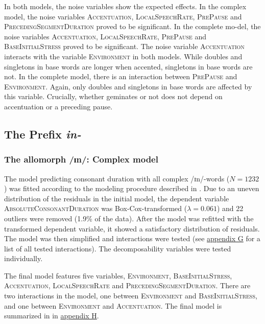  In both models, the noise variables show the expected effects. In the complex model, the noise variables \textsc{Accentuation}, \textsc{LocalSpeechRate}, \textsc{PrePause} and \textsc{PrecedingSegmentDuration} proved to be significant. In the complete mo-del, the noise variables \textsc{Accentuation}, \textsc{LocalSpeechRate}, \textsc{PrePause} and \textsc{BaseInitialStress} proved to be significant.
 The noise variable \textsc{Accentuation} interacts with the variable \textsc{Environment} in both models. While doubles and singletons in base words are longer when accented, singletons in base words are not. In the complete model, there is an interaction between \textsc{PrePause} and \textsc{Environment}. Again, only doubles and singletons in base words are affected by this variable. Crucially,  whether  geminates or not does not depend on accentuation or a preceding pause. 


\subsection{The Prefix \textit{in-}} \label{in experiment}

\subsubsection{The allomorph /ɪn/: Complex model}

The model predicting consonant duration with all complex /ɪn/-words ($N=1232$) was fitted according to the modeling procedure described in . Due to an uneven distribution of the residuals in the initial model, the dependent variable \textsc{AbsoluteConsonantDuration} was Box-Cox-transformed ($\lambda = 0.061$) and 22 outliers were removed (1.9\% of the data).
After the model was refitted with the transformed dependent variable, it showed a satisfactory distribution of residuals.  The model was then simplified and interactions were tested (see \hyperref[Appendix G Summaries of tested interactions in experimental study]{appendix G} for a list of all tested interactions).
The decomposability variables were tested individually.

The final model features five variables, \textsc{Environment}, \textsc{BaseInitialStress}, \textsc{Accentuation}, \textsc{LocalSpeechRate} and \textsc{PrecedingSegmentDuration}. 
There are two interactions in the model, one between \textsc{Environment} and \textsc{BaseInitialStress}, and one between \textsc{Environment} and \textsc{Accentuation}. The final model is summarized in  in \hyperref[Appendix H: Model Summaries Experiment]{appendix H}.


